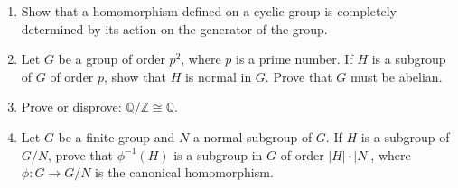 {\begin{enumerate}
 
\item
Show that a homomorphism defined on a cyclic group is completely
determined by its action on the generator of the group.


 
 
\item
Let $G$ be a group of order $p^2$, where $p$ is a prime number. If $H$
is a subgroup of $G$ of order $p$, show that $H$ is normal in $G$.
Prove that $G$ must be abelian. 
 
 

 
 
\item
Prove or disprove: ${\mathbb Q} / {\mathbb Z} \cong {\mathbb Q}$.
 
 
% 
% 
% 
% 
% 
% 
% 
% 
 
\item
Let $G$ be a finite group and $N$ a normal subgroup of $G$. If $H$ is
a subgroup of $G/N$, prove that $\phi^{-1}(H)$ is a subgroup in $G$ of
order $|H| \cdot |N|$, where $\phi : G \rightarrow G/N$ is the
canonical homomorphism. 
 
 
% 
%
% 


\end{enumerate}}
